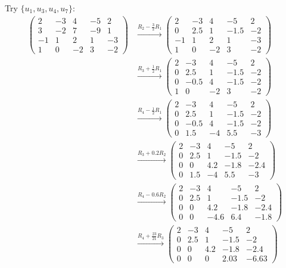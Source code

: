 \documentclass{article}
\begin{document}
Try $\{u_1, u_3, u_4, u_7\}$:
\begin{align*}
\begin{pmatrix}
2 & -3 & 4 & -5 & 2 \\
3 & -2 & 7 & -9 & 1 \\
-1 & 1 & 2 & 1 & -3 \\
1 & 0 & -2 & 3 & -2
\end{pmatrix}
&\xrightarrow{R_2 - \frac{3}{2}R_1}
\begin{pmatrix}
2 & -3 & 4 & -5 & 2 \\
0 & 2.5 & 1 & -1.5 & -2 \\
-1 & 1 & 2 & 1 & -3 \\
1 & 0 & -2 & 3 & -2
\end{pmatrix} \\
&\xrightarrow{R_3 + \frac{1}{2}R_1}
\begin{pmatrix}
2 & -3 & 4 & -5 & 2 \\
0 & 2.5 & 1 & -1.5 & -2 \\
0 & -0.5 & 4 & -1.5 & -2 \\
1 & 0 & -2 & 3 & -2
\end{pmatrix} \\
&\xrightarrow{R_4 - \frac{1}{2}R_1}
\begin{pmatrix}
2 & -3 & 4 & -5 & 2 \\
0 & 2.5 & 1 & -1.5 & -2 \\
0 & -0.5 & 4 & -1.5 & -2 \\
0 & 1.5 & -4 & 5.5 & -3
\end{pmatrix} \\
&\xrightarrow{R_3 + 0.2R_2}
\begin{pmatrix}
2 & -3 & 4 & -5 & 2 \\
0 & 2.5 & 1 & -1.5 & -2 \\
0 & 0 & 4.2 & -1.8 & -2.4 \\
0 & 1.5 & -4 & 5.5 & -3
\end{pmatrix} \\
&\xrightarrow{R_4 - 0.6R_2}
\begin{pmatrix}
2 & -3 & 4 & -5 & 2 \\
0 & 2.5 & 1 & -1.5 & -2 \\
0 & 0 & 4.2 & -1.8 & -2.4 \\
0 & 0 & -4.6 & 6.4 & -1.8
\end{pmatrix} \\
&\xrightarrow{R_4 + \frac{23}{21}R_3}
\begin{pmatrix}
2 & -3 & 4 & -5 & 2 \\
0 & 2.5 & 1 & -1.5 & -2 \\
0 & 0 & 4.2 & -1.8 & -2.4 \\
0 & 0 & 0 & 2.03 & -6.63
\end{pmatrix}
\end{align*}
\end{document}
